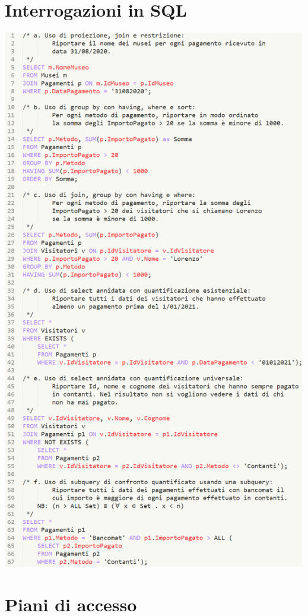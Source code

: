 \documentclass[a4paper, 12pt]{article}
\begin{document}
\section{Interrogazioni in SQL}
\begin{center}
\includegraphics[width=13.3cm]{query2.png}
\end{center}

\section{Piani di accesso}
\end{document}
